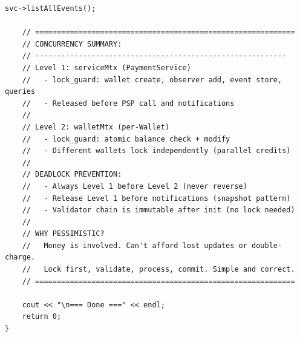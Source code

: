\documentclass[11pt,a4paper]{article}
\begin{document}
\begin{lstlisting}[title={\texttt{main.cpp}}]
    svc->listAllEvents();

    // ============================================================
    // CONCURRENCY SUMMARY:
    // ----------------------------------------------------------
    // Level 1: serviceMtx (PaymentService)
    //   - lock_guard: wallet create, observer add, event store, queries
    //   - Released before PSP call and notifications
    //
    // Level 2: walletMtx (per-Wallet)
    //   - lock_guard: atomic balance check + modify
    //   - Different wallets lock independently (parallel credits)
    //
    // DEADLOCK PREVENTION:
    //   - Always Level 1 before Level 2 (never reverse)
    //   - Release Level 1 before notifications (snapshot pattern)
    //   - Validator chain is immutable after init (no lock needed)
    //
    // WHY PESSIMISTIC?
    //   Money is involved. Can't afford lost updates or double-charge.
    //   Lock first, validate, process, commit. Simple and correct.
    // ============================================================

    cout << "\n=== Done ===" << endl;
    return 0;
}
\end{lstlisting}
\end{document}

